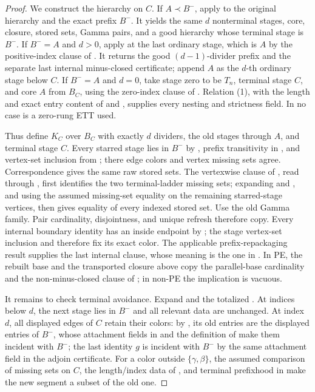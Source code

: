 \begin{proof}
We construct the hierarchy on $C$.  If $A\prec B^-$, apply
 to the original hierarchy
and the exact prefix $B^-$.  It yields the same $d$ nonterminal stages,
core, closure, stored sets, Gamma pairs, and a good hierarchy whose
terminal stage is $B^-$.  If $B^-=A$ and $d>0$, apply
 at the last ordinary stage, which
is $A$ by the positive-index clause of .  It
returns the good $(d-1)$-divider prefix and the separate last internal
minus-closed certificate; append $A$ as the $d$-th ordinary stage below
$C$.  If $B^-=A$ and $d=0$, take stage zero to be $T_n$, terminal stage
$C$, and core $A$ from $B_C$, using the zero-index clause of
.  Relation (1), with the length and exact
entry content of  and
, supplies every nesting and
strictness field.  In no case is a zero-rung ETT used.

Thus define $K_C$ over $B_C$ with exactly $d$ dividers, the old stages
through $A$, and terminal stage $C$.  Every starred stage lies in
$B^-$ by , prefix transitivity in
, and vertex-set inclusion from
; there edge colors and vertex missing sets
agree.  Correspondence gives the same raw stored sets.  The vertexwise
clause of , read through
, first identifies the two terminal-ladder
missing sets; expanding  and
, and using the assumed missing-set
equality on the remaining starred-stage vertices, then gives equality of
every indexed stored set.  Use the old Gamma family.  Pair cardinality,
disjointness, and unique refresh therefore copy.  Every internal boundary
identity has an inside endpoint by ; the stage
vertex-set inclusion and  therefore fix its
exact color.  The applicable prefix-repackaging result supplies the last
internal clause, whose meaning is the one in
.  In PE, the rebuilt base and the
transported closure above copy the parallel-base cardinality and the
non-minus-closed clause of ; in non-PE
the implication is vacuous.

It remains to check terminal avoidance.  Expand
 and the totalized
.  At indices below $d$, the next
stage lies in $B^-$ and all relevant data are unchanged.  At index $d$,
all displayed edges of $C$ retain their colors: by
, its old entries are the displayed
entries of $B^-$, whose attachment fields in  and
the definition of  make them incident with
$B^-$; the last identity $g$ is incident with $B^-$ by the same attachment
field in the adjoin certificate.  For a color outside
$\{\gamma,\beta\}$, the assumed comparison of missing sets on $C$, the
length/index data of , and terminal prefixhood in
 make the new segment a subset of the
old one.


\end{proof}
